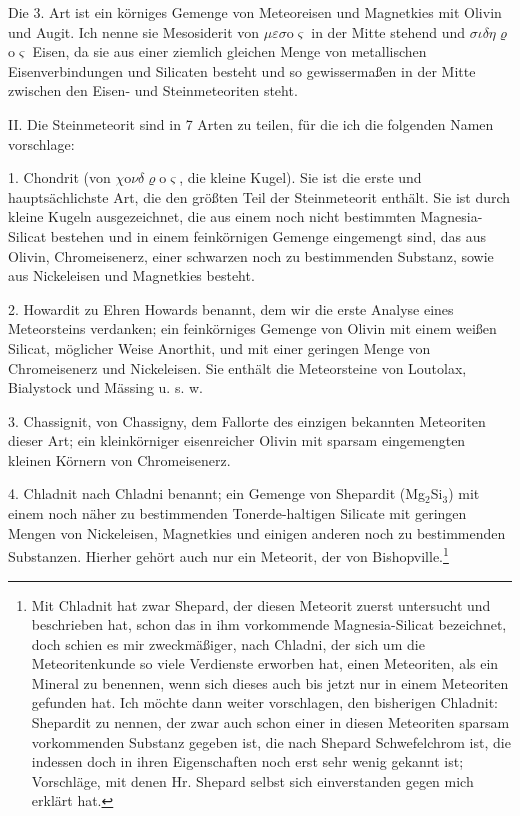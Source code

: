 \documentclass[a4paper, 11pt, oneside]{article}
\begin{document}
Die 3. Art ist ein körniges Gemenge von Meteoreisen und Magnetkies mit Olivin und Augit. Ich nenne sie Mesosiderit von $\mu\varepsilon\sigma$o$\varsigma$ in der Mitte stehend und $\sigma\iota\delta\eta\varrho$o$\varsigma$ Eisen, da sie aus einer ziemlich gleichen Menge von metallischen Eisenverbindungen und Silicaten besteht und so gewissermaßen in der Mitte zwischen den Eisen- und Steinmeteoriten steht.

II. Die Steinmeteorit sind in 7 Arten zu teilen, für die ich die folgenden Namen vorschlage:


1. Chondrit (von $\chi$o$\nu\delta\varrho$o$\varsigma$, die kleine Kugel). Sie ist die erste und hauptsächlichste Art, die den größten Teil der Steinmeteorit enthält. Sie ist durch kleine Kugeln ausgezeichnet, die aus einem noch nicht bestimmten Magnesia-Silicat bestehen und in einem feinkörnigen Gemenge eingemengt sind, das aus Olivin, Chromeisenerz, einer schwarzen noch zu bestimmenden Substanz, sowie aus Nickeleisen und Magnetkies besteht.

2. Howardit zu Ehren Howards benannt, dem wir die erste Analyse eines Meteorsteins verdanken; ein feinkörniges Gemenge von Olivin mit einem weißen Silicat, möglicher Weise Anorthit, und mit einer geringen Menge von Chromeisenerz und Nickeleisen. Sie enthält die Meteorsteine von Loutolax, Bialystock und Mässing u. s. w.

3. Chassignit, von Chassigny, dem Fallorte des einzigen bekannten Meteoriten dieser Art; ein kleinkörniger eisenreicher Olivin mit sparsam eingemengten kleinen Körnern von Chromeisenerz.

4. Chladnit nach Chladni benannt; ein Gemenge von Shepardit (Mg$_{2}$Si$_{3}$) mit einem noch näher zu bestimmenden Tonerde-haltigen Silicate mit geringen Mengen von Nickeleisen, Magnetkies und einigen anderen noch zu bestimmenden Substanzen. Hierher gehört auch nur ein Meteorit, der von Bishopville.\footnote{Mit Chladnit hat zwar Shepard, der diesen Meteorit zuerst untersucht und beschrieben hat, schon das in ihm vorkommende Magnesia-Silicat bezeichnet, doch schien es mir zweckmäßiger, nach Chladni, der sich um die Meteoritenkunde so viele Verdienste erworben hat, einen Meteoriten, als ein Mineral zu benennen, wenn sich dieses auch bis jetzt nur in einem Meteoriten gefunden hat. Ich möchte dann weiter vorschlagen, den bisherigen Chladnit: Shepardit zu nennen, der zwar auch schon einer in diesen Meteoriten sparsam vorkommenden Substanz gegeben ist, die nach Shepard Schwefelchrom ist, die indessen doch in ihren Eigenschaften noch erst sehr wenig gekannt ist; Vorschläge, mit denen Hr. Shepard selbst sich einverstanden gegen mich erklärt hat.}
\end{document}
